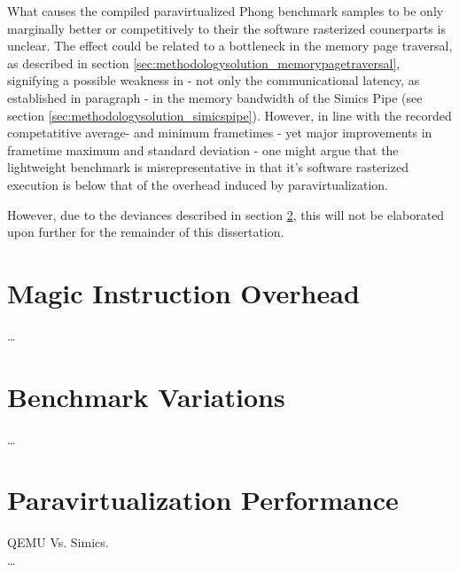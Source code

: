 What causes the compiled paravirtualized Phong benchmark samples to be only marginally better or competitively to their the software rasterized counerparts is unclear.
The effect could be related to a bottleneck in the memory page traversal, as described in section \ref{sec:methodologysolution_memorypagetraversal}, signifying a possible weakness in - not only the communicational latency, as established in paragraph  - in the memory bandwidth of the Simics Pipe (see section \ref{sec:methodologysolution_simicspipe}).
However, in line with the recorded competatitive average- and minimum frametimes  - yet major improvements in frametime maximum and standard deviation - one might argue that the lightweight benchmark is misrepresentative in that it's software rasterized execution is below that of the overhead induced by paravirtualization.

However, due to the deviances described in section \ref{sec:analysisexperiment_benchmarkvariations}, this will not be elaborated upon further for the remainder of this dissertation.

\section{Magic Instruction Overhead}
\label{sec:analysisexperiment_magicinstructionoverhead}
\ldots


\section{Benchmark Variations}
\label{sec:analysisexperiment_benchmarkvariations}
\ldots




\section{Paravirtualization Performance}
\label{sec:analysisexperiment_paravirtualizationperformance}
QEMU Vs. Simics.\\
\ldots